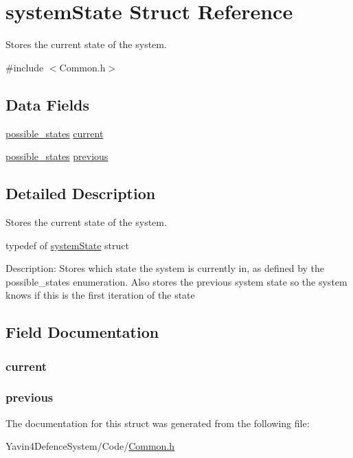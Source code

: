 \hypertarget{structsystemState}{\section{system\+State Struct Reference}
\label{structsystemState}
}


Stores the current state of the system.  




{\ttfamily \#include $<$Common.\+h$>$}

\subsection*{Data Fields}
\begin{DoxyCompactItemize}
\item 
\hyperlink{Common_8h_a05931287b056487cf89495f39026fbe1}{possible\+\_\+states} \hyperlink{structsystemState_a18284a4a782e71c070e1d2e80734509d}{current}
\item 
\hyperlink{Common_8h_a05931287b056487cf89495f39026fbe1}{possible\+\_\+states} \hyperlink{structsystemState_af2f2716b4afa23c8b53a9351a0924b6b}{previous}
\end{DoxyCompactItemize}


\subsection{Detailed Description}
Stores the current state of the system. 



 typedef of \hyperlink{structsystemState}{system\+State} struct

Description\+: Stores which state the system is currently in, as defined by the possible\+\_\+states enumeration. Also stores the previous system state so the system knows if this is the first iteration of the state 

\subsection{Field Documentation}
\hypertarget{structsystemState_a18284a4a782e71c070e1d2e80734509d}{
\subsubsection[{current}]{ current}}\label{structsystemState_a18284a4a782e71c070e1d2e80734509d}
\hypertarget{structsystemState_af2f2716b4afa23c8b53a9351a0924b6b}{
\subsubsection[{previous}]{ previous}}\label{structsystemState_af2f2716b4afa23c8b53a9351a0924b6b}


The documentation for this struct was generated from the following file\+:\begin{DoxyCompactItemize}
\item 
Yavin4\+Defence\+System/\+Code/\hyperlink{Common_8h}{Common.\+h}\end{DoxyCompactItemize}
